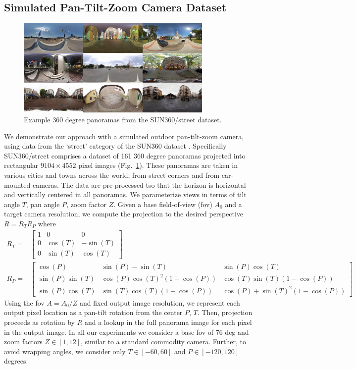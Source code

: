 \subsection{Simulated Pan-Tilt-Zoom Camera Dataset}
\begin{figure}
    \centering
    \includegraphics[width=0.85\textwidth]{figures/ptz/sun360_9x.jpg}
    \caption{Example 360 degree panoramas from the SUN360/street dataset.}
    \label{fig:sun360_ex}
\end{figure}

We demonstrate our approach with a simulated outdoor pan-tilt-zoom camera, using data from the `street' category of the SUN360 dataset \citep{SUN360}. Specifically SUN360/street comprises a dataset of 161 360 degree panoramas projected into rectangular $9104 \times 4552$ pixel images (Fig.~\ref{fig:sun360_ex}). These panoramas are taken in various cities and towns across the world, from street corners and from car-mounted cameras. The data are pre-processed tso that the horizon is horizontal and vertically centered in all panoramas. We parameterize views in terms of tilt angle $T$, pan angle $P$, zoom factor $Z$. Given a base field-of-view (fov) $A_0$ and a target camera resolution, we compute the projection to the desired perspective $R = R_TR_P$ where
\begin{equation}
\begin{split}
R_T =& 
\begin{bmatrix}
1 & 0 & 0\\
0 & \cos(T) & -\sin(T)\\
0 & \sin(T) & \cos(T)
\end{bmatrix}\\
R_P =&  
\begin{bmatrix}
\cos(P)        & \sin(P) - \sin(T)            & \sin(P)\cos(T)\\
\sin(P)\sin(T) & \cos(P)\cos(T)^2(1 -\cos(P)) & \cos(T)\sin(T)(1-\cos(P))\\
\sin(P)\cos(T) & \sin(T)\cos(T)(1-\cos(P))    & \cos(P)+\sin(T)^2(1-\cos(P))
\end{bmatrix}
\end{split}
\end{equation}
Using the fov $A = A_0/Z$ and fixed output image resolution, we represent each output pixel location as a pan-tilt rotation from the center $P$, $T$. Then, projection proceeds as rotation by $R$ and a lookup in the full panorama image for each pixel in the output image. In all our experiments we consider a base fov of 76 deg and zoom factors $Z \in [1, 12]$, similar to a standard commodity camera. Further, to avoid wrapping angles, we consider only $T \in [-60, 60]$ and $P \in [-120, 120]$ degrees.

